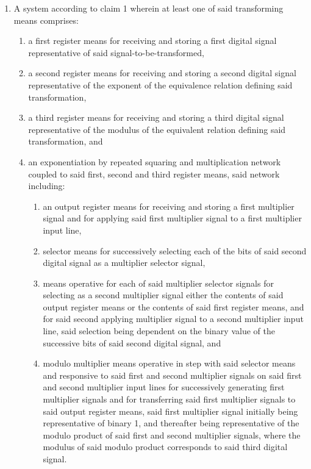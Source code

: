 \documentclass[12pt, a4paper]{article}
\begin{document}
\begin{enumerate}
\item
A system according to claim 1 wherein at least one of said transforming means comprises:
	\begin{enumerate}
		\item
			a first register means for receiving and storing a first digital signal representative of said signal-to-be-transformed,
		\item
		a second register means for receiving and storing a second digital signal representative of the exponent of the equivalence relation defining said transformation,
		\item
		a third register means for receiving and storing a third digital signal representative of the modulus of the equivalent relation defining said transformation, and
		\item
		an exponentiation by repeated squaring and multiplication network coupled to said first, second and third register means, said network including:
			\begin{enumerate}
				\item
				an output register means for receiving and storing a first multiplier signal and for applying said first multiplier signal to a first multiplier input line,
				\item
				selector means for successively selecting each of the bits of said second digital signal as a multiplier selector signal,
				\item
				means operative for each of said multiplier selector signals for selecting as a second multiplier signal either the contents of said output register means or the contents of said first register means, and for said second applying multiplier signal to a second multiplier input line, said selection being dependent on the binary value of the successive bits of said second digital signal, and
				\item
				modulo multiplier means operative in step with said selector means and responsive to said first and second multiplier signals on said first and second multiplier input lines for successively generating first multiplier signals and for transferring said first multiplier signals to said output register means, said first multiplier signal initially being representative of binary 1, and thereafter being representative of the modulo product of said first and second multiplier signals, where the modulus of said modulo product corresponds to said third digital signal.
				
			\end{enumerate}
	\end{enumerate}
	

\end{enumerate}
\end{document}
